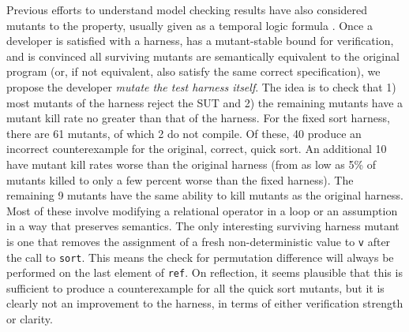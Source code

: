 \documentclass[conference]{IEEEtran}
\begin{document}
Previous efforts to understand model checking results have also
considered mutants to the property, usually given as a temporal logic
formula \cite{MutSpec}.  Once a developer is satisfied with a harness,
has a mutant-stable bound for verification, and is convinced all
surviving mutants are semantically equivalent to the original program
(or, if not equivalent, also satisfy the same correct specification),
we propose the developer \emph{mutate the test harness itself}.  The
idea is to check that 1) most mutants of the harness reject the SUT
and 2) the remaining mutants have a mutant kill rate no greater than
that of the harness.  For the fixed sort harness, there are 61 mutants, of
which 2 do not compile.  Of these, 40 produce an incorrect
counterexample for the original, correct, quick sort.  An additional
10 have mutant kill rates worse than the original harness (from
as low as 5\% of mutants killed to only a few percent worse than the
fixed harness).  The remaining 9 mutants have the same ability to kill
mutants as the original harness.  Most of these involve modifying a
relational operator in a loop or an assumption in a way that preserves
semantics.  The only interesting surviving
harness mutant is one that removes the assignment of a fresh
non-deterministic value to {\tt v} after the call to {\tt sort}.  This
means the check for permutation difference will always be performed on
the last element of {\tt ref}.  On reflection, it seems plausible
that this is sufficient to produce a counterexample for all the quick
sort mutants, but it is clearly not an improvement to the harness, in
terms of either verification strength or clarity.
\end{document}
